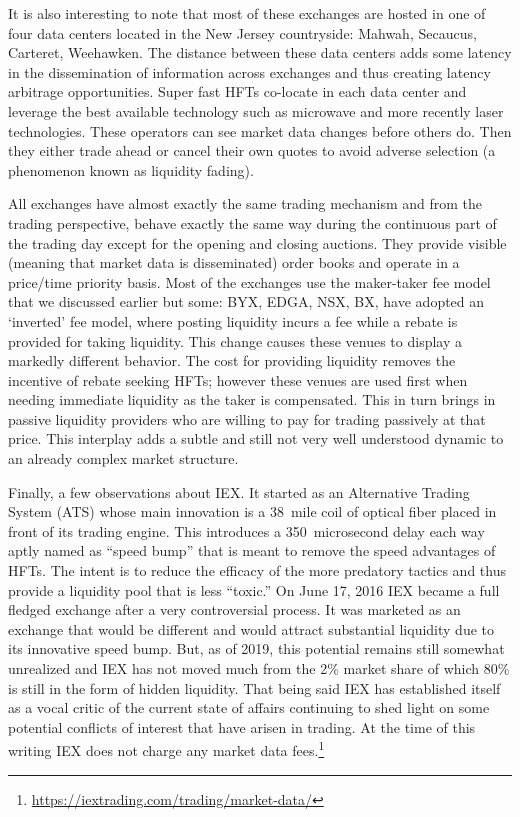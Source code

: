 It is also interesting to note that most of these exchanges are hosted in one of four data centers located in the New Jersey countryside: Mahwah, Secaucus, Carteret, Weehawken. The distance between these data centers adds some latency in the dissemination of information across exchanges and thus creating latency arbitrage opportunities. Super fast HFTs co-locate in each data center and leverage the best available technology such as microwave and more recently laser technologies. These operators can see market data changes before others do. Then they either trade ahead or cancel their own quotes to avoid adverse selection (a phenomenon known as liquidity fading).


All exchanges have almost exactly the same trading mechanism and from the trading perspective, behave exactly the same way during the continuous part of the trading day except for the opening and closing auctions. They provide visible (meaning that market data is disseminated) order books and operate in a price/time priority basis. Most of the exchanges use the maker-taker fee model\label{in:takerfee2} that we discussed earlier but some: BYX, EDGA, NSX, BX, have adopted an `inverted' fee model, where posting liquidity incurs a fee while a rebate is provided for taking liquidity. This change causes these venues to display a markedly different behavior. The cost for providing liquidity removes the incentive of rebate seeking HFTs; however  these venues are used first when needing immediate liquidity as the taker is compensated. This in turn brings in passive liquidity providers who are willing to pay for trading passively at that price. This interplay adds a subtle and still not very well understood dynamic to an already complex market structure.


Finally, a few observations about IEX. It started as an Alternative Trading System (ATS) whose main innovation is a 38~mile coil of optical fiber placed in front of its trading engine. This introduces a 350~microsecond delay each way aptly named as ``speed bump'' that is meant to remove the speed advantages of HFTs. The intent is to reduce the efficacy of the more predatory tactics and thus provide a liquidity pool that is less ``toxic.'' On June 17, 2016 IEX became a full fledged exchange after a very controversial process. It was marketed as an exchange that would be different and would attract substantial liquidity due to its innovative speed bump. But, as of 2019, this potential remains still somewhat unrealized and IEX has not moved much from the 2\% market share of which 80\% is still in the form of hidden liquidity. That being said IEX has established itself as a vocal critic of the current state of affairs continuing to shed light on some potential conflicts of interest that have arisen in trading. At the time of this writing IEX does not charge any market data fees.\footnote{\url{https://iextrading.com/trading/market-data/}} \twomedskip


